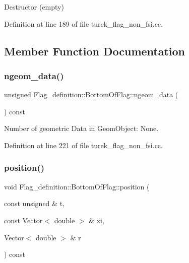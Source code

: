 Destructor (empty) 



Definition at line 189 of file turek\+\_\+flag\+\_\+non\+\_\+fsi.\+cc.



\subsection{Member Function Documentation}
\mbox{\label{classFlag__definition_1_1BottomOfFlag_a7aba815793bcc775d97b6be533ff6b44}} 
\subsubsection{\texorpdfstring{ngeom\+\_\+data()}{ngeom\_data()}}
{\footnotesize\ttfamily unsigned Flag\+\_\+definition\+::\+Bottom\+Of\+Flag\+::ngeom\+\_\+data (\begin{DoxyParamCaption}{ }\end{DoxyParamCaption}) const\hspace{0.3cm}{\ttfamily [inline]}}



Number of geometric Data in Geom\+Object\+: None. 



Definition at line 221 of file turek\+\_\+flag\+\_\+non\+\_\+fsi.\+cc.

\mbox{\label{classFlag__definition_1_1BottomOfFlag_a3d3054be363af2acfeca9769bd7c6684}} 
\subsubsection{\texorpdfstring{position()}{position()}\hspace{0.1cm}{\footnotesize\ttfamily [1/2]}}
{\footnotesize\ttfamily void Flag\+\_\+definition\+::\+Bottom\+Of\+Flag\+::position (\begin{DoxyParamCaption}\item[{const unsigned \&}]{t,  }\item[{const Vector$<$ double $>$ \&}]{xi,  }\item[{Vector$<$ double $>$ \&}]{r }\end{DoxyParamCaption}) const\hspace{0.3cm}{\ttfamily [inline]}}



